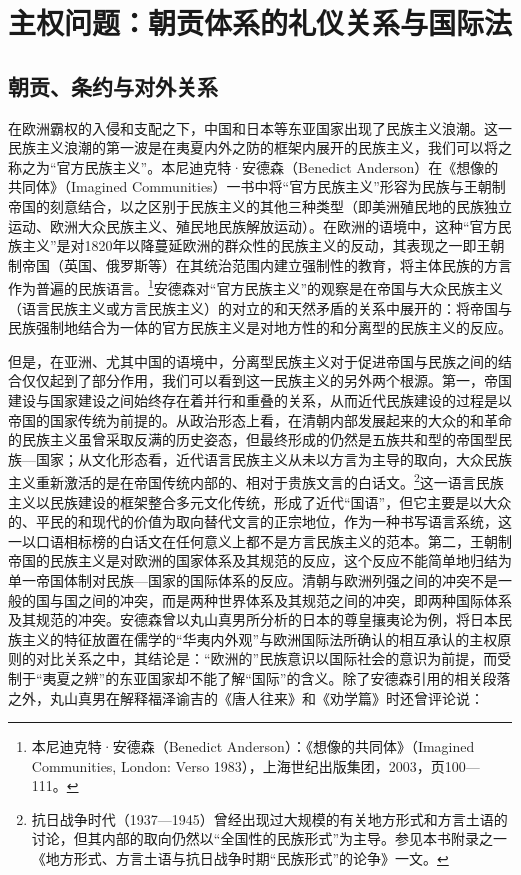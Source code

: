 \documentclass[a4paper, 12pt, openright]{ctexbook}
\begin{document}
\section{主权问题：朝贡体系的礼仪关系与国际法}

\subsection{朝贡、条约与对外关系}

在欧洲霸权的入侵和支配之下，中国和日本等东亚国家出现了民族主义浪潮。这一民族主义浪潮的第一波是在夷夏内外之防的框架内展开的民族主义，我们可以将之称之为“官方民族主义”。本尼迪克特·安德森（Benedict Anderson）在《想像的共同体》（Imagined Communities）一书中将“官方民族主义”形容为民族与王朝制帝国的刻意结合，以之区别于民族主义的其他三种类型（即美洲殖民地的民族独立运动、欧洲大众民族主义、殖民地民族解放运动）。在欧洲的语境中，这种“官方民族主义”是对1820年以降蔓延欧洲的群众性的民族主义的反动，其表现之一即王朝制帝国（英国、俄罗斯等）在其统治范围内建立强制性的教育，将主体民族的方言作为普遍的民族语言。\footnote{本尼迪克特·安德森（Benedict Anderson）：《想像的共同体》（Imagined Communities, London: Verso 1983），上海世纪出版集团，2003，页100—111。}安德森对“官方民族主义”的观察是在帝国与大众民族主义（语言民族主义或方言民族主义）的对立的和天然矛盾的关系中展开的：将帝国与民族强制地结合为一体的官方民族主义是对地方性的和分离型的民族主义的反应。

但是，在亚洲、尤其中国的语境中，分离型民族主义对于促进帝国与民族之间的结合仅仅起到了部分作用，我们可以看到这一民族主义的另外两个根源。第一，帝国建设与国家建设之间始终存在着并行和重叠的关系，从而近代民族建设的过程是以帝国的国家传统为前提的。从政治形态上看，在清朝内部发展起来的大众的和革命的民族主义虽曾采取反满的历史姿态，但最终形成的仍然是五族共和型的帝国型民族—国家；从文化形态看，近代语言民族主义从未以方言为主导的取向，大众民族主义重新激活的是在帝国传统内部的、相对于贵族文言的白话文。\footnote{抗日战争时代（1937—1945）曾经出现过大规模的有关地方形式和方言土语的讨论，但其内部的取向仍然以“全国性的民族形式”为主导。参见本书附录之一《地方形式、方言土语与抗日战争时期“民族形式”的论争》一文。}这一语言民族主义以民族建设的框架整合多元文化传统，形成了近代“国语”，但它主要是以大众的、平民的和现代的价值为取向替代文言的正宗地位，作为一种书写语言系统，这一以口语相标榜的白话文在任何意义上都不是方言民族主义的范本。第二，王朝制帝国的民族主义是对欧洲的国家体系及其规范的反应，这个反应不能简单地归结为单一帝国体制对民族—国家的国际体系的反应。清朝与欧洲列强之间的冲突不是一般的国与国之间的冲突，而是两种世界体系及其规范之间的冲突，即两种国际体系及其规范的冲突。安德森曾以丸山真男所分析的日本的尊皇攘夷论为例，将日本民族主义的特征放置在儒学的“华夷内外观”与欧洲国际法所确认的相互承认的主权原则的对比关系之中，其结论是：“欧洲的”民族意识以国际社会的意识为前提，而受制于“夷夏之辨”的东亚国家却不能了解“国际”的含义。除了安德森引用的相关段落之外，丸山真男在解释福泽谕吉的《唐人往来》和《劝学篇》时还曾评论说：
\end{document}
